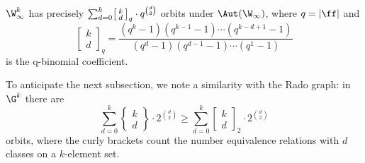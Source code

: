 \begin{proposition}\label{prop:symplectic-oligomorphic}
    $\W_\infty^k$ has precisely \(
        \sum_{d = 0}^k \begin{bsmallmatrix}k \\ d \end{bsmallmatrix}_q \cdot q^{\binom{d}{2}}
    \) orbits under $\Aut(\W_\infty)$,
    where $q = \vert \ff \vert$ and \[
        \begin{bmatrix}k \\ d \end{bmatrix}_q 
        = \frac{
            (q^k - 1)(q^{k-1} - 1) \cdots (q^{k-d+1} - 1)
        }{
            (q^d - 1) (q^{d-1} - 1) \cdots (q^1 - 1)
        }
    \] is the q-binomial coefficient.
\end{proposition}
\begin{remark}
    To anticipate the next subsection, we note a similarity with the Rado graph: 
    in $\G^k$ there are \[
        \sum_{d=0}^k \left\{\begin{matrix}k \\ d \end{matrix}\right\} \cdot 2^{\binom{d}{2}}
        \geq 
        \sum_{d = 0}^k \begin{bmatrix}k \\ d \end{bmatrix}_2 \cdot 2^{\binom{d}{2}}
    \] orbits,
    where the curly brackets count the number equivalence relations with $d$ classes on a $k$-element set.
\end{remark}

